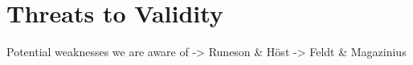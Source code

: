 \iffalse  \fi
\chapter{Threats to Validity}
Potential weaknesses we are aware of
-> Runeson \& Höst
-> Feldt \& Magazinius